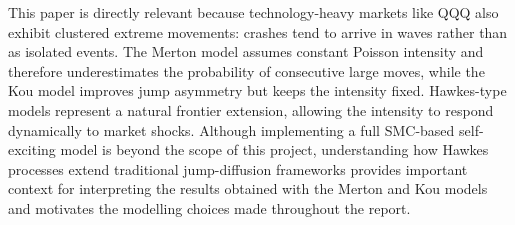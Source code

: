 \documentclass[12pt,a4paper]{article}
\begin{document}
This paper is directly relevant because technology-heavy markets
like QQQ also exhibit clustered extreme movements: crashes tend
to arrive in waves rather than as isolated events. The Merton
model assumes constant Poisson intensity and therefore
underestimates the probability of consecutive large moves, while
the Kou model improves jump asymmetry but keeps the intensity
fixed. Hawkes-type models represent a natural frontier extension,
allowing the intensity to respond dynamically to market shocks.
Although implementing a full SMC-based self-exciting model is
beyond the scope of this project, understanding how Hawkes
processes extend traditional jump-diffusion frameworks provides
important context for interpreting the results obtained with the
Merton and Kou models and motivates the modelling choices made
throughout the report.
\end{document}
